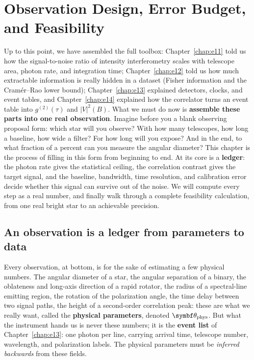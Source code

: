 \chapter{Observation Design, Error Budget, and Feasibility}
\label{chap:e15}

\begin{chapteropening}
Up to this point, we have assembled the full toolbox: Chapter~\ref{chap:e11} told us how the signal-to-noise ratio of intensity interferometry scales with telescope area, photon rate, and integration time; Chapter~\ref{chap:e12} told us how much extractable information is really hidden in a dataset (Fisher information and the Cramér--Rao lower bound); Chapter~\ref{chap:e13} explained detectors, clocks, and event tables, and Chapter~\ref{chap:e14} explained how the correlator turns an event table into $g^{(2)}(\tau)$ and $|V|^2(B)$. What we must do now is \textbf{assemble these parts into one real observation}. Imagine before you a blank observing proposal form: which star will you observe? With how many telescopes, how long a baseline, how wide a filter? For how long will you expose? And in the end, to what fraction of a percent can you measure the angular diameter? This chapter is the process of filling in this form from beginning to end. At its core is a \textbf{ledger}: the photon rate gives the statistical ceiling, the correlation contrast gives the target signal, and the baseline, bandwidth, time resolution, and calibration error decide whether this signal can survive out of the noise. We will compute every step as a real number, and finally walk through a complete feasibility calculation, from one real bright star to an achievable precision.
\end{chapteropening}

\section{An observation is a ledger from parameters to data}
\label{sec:e15-ledger}

Every observation, at bottom, is for the sake of estimating a few physical numbers. The angular diameter of a star, the angular separation of a binary, the oblateness and long-axis direction of a rapid rotator, the radius of a spectral-line emitting region, the rotation of the polarization angle, the time delay between two signal paths, the height of a second-order correlation peak: these are what we really want, called the \textbf{physical parameters}, denoted $\bm\theta_{\rm phys}$. But what the instrument hands us is never these numbers; it is the \textbf{event list} of Chapter~\ref{chap:e13}: one photon per line, carrying arrival time, telescope number, wavelength, and polarization labels. The physical parameters must be \emph{inferred backwards} from these fields.

